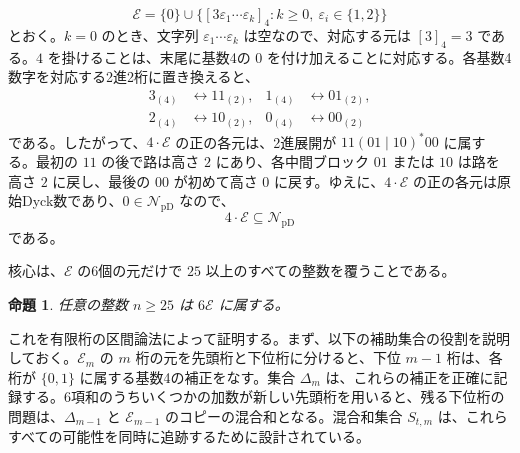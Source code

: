 \documentclass[12pt]{ltjsarticle}
\theoremstyle{plain}
\newtheorem{proposition}[theorem]{命題}
\theoremstyle{definition}
\theoremstyle{plain}
\newcommand{\val}[2]{[#1]_{#2}}
\newcommand{\NpD}{\mathcal{N}_{\mathrm{pD}}}
\begin{document}
\[
 \mathcal E=\{0\}\cup
 \bigl\{\val{3\varepsilon_1\cdots\varepsilon_k}{4}:
        k\geq0,\ \varepsilon_i\in\{1,2\}\bigr\}
\]
とおく。$k=0$ のとき、文字列 $\varepsilon_1\cdots\varepsilon_k$ は空なので、対応する元は $\val{3}{4}=3$ である。$4$ を掛けることは、末尾に基数4の $0$ を付け加えることに対応する。各基数4数字を対応する2進2桁に置き換えると、
\[
\begin{aligned}
 3_{(4)}&\longleftrightarrow11_{(2)},&
 1_{(4)}&\longleftrightarrow01_{(2)},\\
 2_{(4)}&\longleftrightarrow10_{(2)},&
 0_{(4)}&\longleftrightarrow00_{(2)}
\end{aligned}
\]
である。したがって、$4\cdot\mathcal E$ の正の各元は、2進展開が $11(01\mid10)^*00$ に属する。最初の $11$ の後で路は高さ $2$ にあり、各中間ブロック $01$ または $10$ は路を高さ $2$ に戻し、最後の $00$ が初めて高さ $0$ に戻す。ゆえに、$4\cdot\mathcal E$ の正の各元は原始Dyck数であり、$0\in\NpD$ なので、
\begin{equation}\label{eq:4E}
        4\cdot\mathcal E\subseteq\NpD
\end{equation}
である。

核心は、$\mathcal E$ の6個の元だけで $25$ 以上のすべての整数を覆うことである。

\begin{proposition}\label{prop:E}
任意の整数 $n\geq25$ は $6\mathcal E$ に属する。
\end{proposition}

これを有限桁の区間論法によって証明する。まず、以下の補助集合の役割を説明しておく。$\mathcal E_m$ の $m$ 桁の元を先頭桁と下位桁に分けると、下位 $m-1$ 桁は、各桁が $\{0,1\}$ に属する基数4の補正をなす。集合 $\Delta_m$ は、これらの補正を正確に記録する。6項和のうちいくつかの加数が新しい先頭桁を用いると、残る下位桁の問題は、$\Delta_{m-1}$ と $\mathcal E_{m-1}$ のコピーの混合和となる。混合和集合 $S_{t,m}$ は、これらすべての可能性を同時に追跡するために設計されている。
\end{document}
